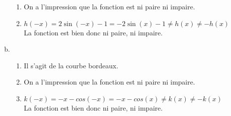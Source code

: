 \documentclass[12pt, a4paper]{article}
\begin{document}
\begin{Exercise}[number={80}]
\begin{enumerate}[a)]
\begin{enumerate}[1)]
                    \item On a l'impression que la fonction est ni paire ni impaire.
                    \item $h(-x)=2\sin(-x)-1=-2\sin(x)-1\neq h(x)\neq -h(x)$ \\ La fonction est bien donc ni paire, ni impaire.
                \end{enumerate}\smallbreak
        \item   \begin{enumerate}[1)]
                    \item Il s'agit de la courbe bordeaux.
                    \item On a l'impression que la fonction est ni paire ni impaire.
                    \item $k(-x)=-x-cos(-x)=-x-cos(x)\neq k(x)\neq -k(x)$ \\ La fonction est bien donc ni paire, ni impaire.
                \end{enumerate}
    \end{enumerate}
\end{Exercise}

\pagebreak
\end{document}
